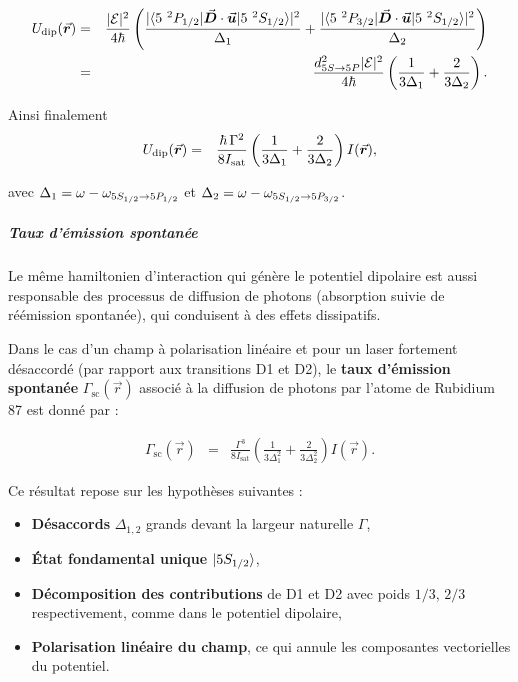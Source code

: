 \begin{eqnarray}
	U_{\mathrm{dip}}(\operatorvec{r}) &  = & \frac{ \vert \mathcal{E} \vert^2}{4 \hbar} \left( \frac{ \vert \langle 5 {~}^2P_{1/2}  \vert \operatorvec{D} \cdot \operatorvec{u}\vert 5 {~}^2S_{1/2}  \rangle \vert^2}{ \Delta_1} + \frac{ \vert\langle 5 {~}^2P_{3/2}  \vert \operatorvec{D} \cdot \operatorvec{u}\vert 5 {~}^2S_{1/2}  \rangle \vert^2}{ \Delta_2}  \right )\\ & = &  \frac{  d_{\scriptstyle \tiny  5S \rightarrow 5P}^2 \vert \mathcal{E} \vert^2 }{4 \hbar} \left( \frac{ 1}{ 3 \Delta_1} + \frac{2 }{ 3 \Delta_2}  \right ).		
\end{eqnarray}

Ainsi finalement 
\begin{eqnarray}\label{eq:7.47}
	U_{\mathrm{dip}}(\vec{{\bm{r}}}) &=& \frac{\hbar \, \Gamma^2}{8 I_{\mathrm{sat}}} \left( \frac{ 1}{ 3 \Delta_1} + \frac{2 }{ 3 \Delta_2}  \right ) I(\vec{{\bm{r}}}) ,	
\end{eqnarray}

avec $\Delta_1 = \omega -\omega_{\scriptstyle \tiny 5S_{1/2} \rightarrow 5P_{1/2}} $ et $\Delta_2 = \omega -\omega_{\scriptstyle \tiny 5S_{1/2} \rightarrow 5P_{3/2}} $.

\subparagraph{Taux d’émission spontanée}
Le même hamiltonien d’interaction qui génère le potentiel dipolaire est aussi responsable des processus de diffusion de photons (absorption suivie de réémission spontanée), qui conduisent à des effets dissipatifs.


\smallskip

Dans le cas d’un champ à polarisation linéaire et pour un laser fortement désaccordé 
(par rapport aux transitions D1 et D2), le {\bf taux d’émission spontanée} 
$\Gamma_{\mathrm{sc}}(\vec{r})$ associé à la diffusion de photons par l’atome de Rubidium 87 
est donné par :

\begin{eqnarray}\label{eq:7.48}
\Gamma_{\mathrm{sc}}(\vec{r}) & = & \frac{\Gamma^3}{8 I_{\mathrm{sat}}} \left( \frac{1}{3 \Delta_1^2} + \frac{2}{3 \Delta_2^2} \right) I(\vec{r}) .
\label{eq:scattering_rate}
\end{eqnarray}

Ce résultat repose sur les hypothèses suivantes :
\begin{itemize}[label = $\bullet$]
	\item {\bf Désaccords} $\Delta_{1,2}$  grands devant la largeur naturelle $\Gamma$,
	\item {\bf État fondamental unique} $\ket{5S_{1/2}}$,
	\item {\bf Décomposition des contributions} de D1 et D2 avec poids $1/3$, $2/3$ respectivement, comme dans le potentiel dipolaire,
	\item {\bf Polarisation linéaire du champ}, ce qui annule les composantes vectorielles du potentiel.
\end{itemize}






